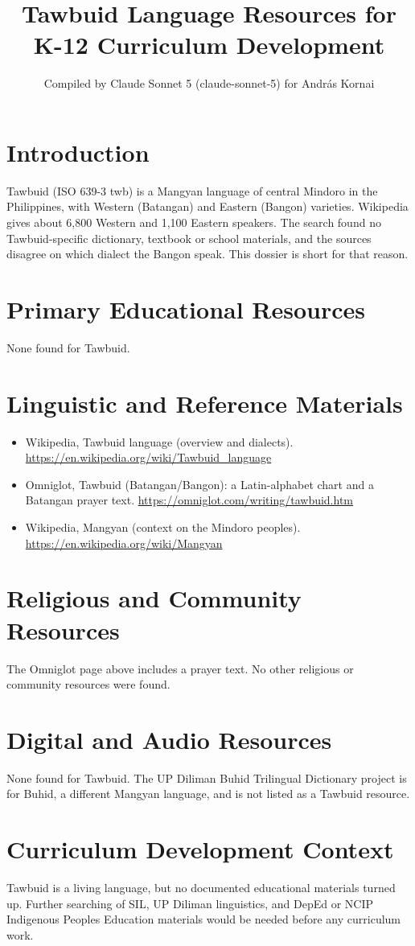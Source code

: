 \documentclass[12pt]{article}
\title{Tawbuid Language Resources for K-12 Curriculum Development}
\author{Compiled by Claude Sonnet 5 (claude-sonnet-5) for Andr\'as Kornai}
\date{}
\begin{document}
\maketitle

\section{Introduction}
Tawbuid (ISO 639-3 twb) is a Mangyan language of central Mindoro in the Philippines, with Western (Batangan) and Eastern (Bangon) varieties. Wikipedia gives about 6,800 Western and 1,100 Eastern speakers. The search found no Tawbuid-specific dictionary, textbook or school materials, and the sources disagree on which dialect the Bangon speak. This dossier is short for that reason.

\section{Primary Educational Resources}
None found for Tawbuid.

\section{Linguistic and Reference Materials}
\begin{itemize}
\item Wikipedia, Tawbuid language (overview and dialects). \url{https://en.wikipedia.org/wiki/Tawbuid_language}
\item Omniglot, Tawbuid (Batangan/Bangon): a Latin-alphabet chart and a Batangan prayer text. \url{https://omniglot.com/writing/tawbuid.htm}
\item Wikipedia, Mangyan (context on the Mindoro peoples). \url{https://en.wikipedia.org/wiki/Mangyan}
\end{itemize}

\section{Religious and Community Resources}
The Omniglot page above includes a prayer text. No other religious or community resources were found.

\section{Digital and Audio Resources}
None found for Tawbuid. The UP Diliman Buhid Trilingual Dictionary project is for Buhid, a different Mangyan language, and is not listed as a Tawbuid resource.

\section{Curriculum Development Context}
Tawbuid is a living language, but no documented educational materials turned up. Further searching of SIL, UP Diliman linguistics, and DepEd or NCIP Indigenous Peoples Education materials would be needed before any curriculum work.
\end{document}
